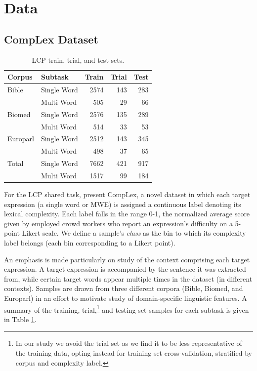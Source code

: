 \documentclass[11pt,a4paper]{article}
\begin{document}
\section{Data}

\subsection{CompLex Dataset}

\begin{table}
  \centering
  \begin{tabular}{l|l|r|r|r}
    \toprule
    \centering
    Corpus & Subtask & Train &  Trial &  Test \\
    \midrule
    Bible & Single Word &   2574 &    143 &   283 \\
            & Multi Word &    505 &     29 &    66 \\
    Biomed & Single Word &   2576 &    135 &   289 \\
            & Multi Word &    514 &     33 &    53 \\
    Europarl & Single Word &   2512 &    143 &   345 \\
            & Multi Word &    498 &     37 &    65 \\
    \midrule
    Total & Single Word & 7662 & 421 & 917 \\
          & Multi Word &    1517 &     99 &    184 \\
    \bottomrule
  \end{tabular}
  \caption{\label{tab:datasets} LCP train, trial, and test sets.}
\end{table}

For the LCP shared task, \citet{shardlow2020complex} present CompLex, a novel dataset in which each target expression (a single word or MWE) is assigned a continuous label denoting its lexical complexity. Each label falls in the range 0-1, the normalized average score given by employed crowd workers who report an expression's difficulty on a 5-point Likert scale. We define a sample's \textit{class} as the bin to which its complexity label belongs (each bin corresponding to a Likert point).

An emphasis is made particularly on study of the context comprising each target expression. A target expression is accompanied by the sentence it was extracted from, while certain target words appear multiple times in the dataset (in different contexts). Samples are drawn from three different corpora (Bible, Biomed, and Europarl) in an effort to motivate study of domain-specific linguistic features. A summary of the training, trial,\footnote{In our study we avoid the trial set as we find it to be less representative of the training data, opting instead for training set cross-validation, stratified by corpus and complexity label.} and testing set samples for each subtask is given in Table \ref{tab:datasets}.
\end{document}
